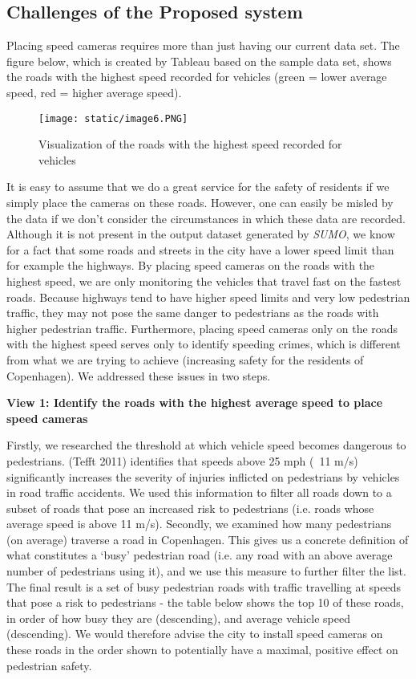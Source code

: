 \documentclass[format=acmsmall, review=false, screen=true]{acmart}
\begin{document}
\subsection{Challenges of the Proposed system}

Placing speed cameras requires more than just having our current data set. The figure below, which is created by Tableau based on the sample data set, shows the roads with the highest speed recorded for vehicles (green = lower average speed, red = higher average speed).

\begin{figure}[H]
  \texttt{[image: static/image6.PNG]}
  \caption{Visualization of the roads with the highest speed recorded for vehicles}
  \label{fig:verticalpartitioning-diagram}
\end{figure}


It is easy to assume that we do a great service for the safety of residents if we simply place the cameras on these roads. However, one can easily be misled by the data if we don’t consider the circumstances in which these data are recorded. Although it is not present in the output dataset generated by \textit{SUMO}, we know for a fact that some roads and streets in the city have a lower speed limit than for example the highways. By placing speed cameras on the roads with the highest speed, we are only monitoring the vehicles that travel fast on the fastest roads. Because highways tend to have higher speed limits and very low pedestrian traffic, they may not pose the same danger to pedestrians as the roads with higher pedestrian traffic. Furthermore, placing speed cameras only on the roads with the highest speed serves only to identify speeding crimes, which is different from what we are trying to achieve (increasing safety for the residents of Copenhagen). We addressed these issues in two steps.

\textbf{View 1: Identify the roads with the highest average speed to place speed cameras}

Firstly, we researched the threshold at which vehicle speed becomes dangerous to pedestrians. (Tefft 2011) identifies that speeds above 25 mph (~11 m/s) significantly increases the severity of injuries inflicted on pedestrians by vehicles in road traffic accidents. We used this information to filter all roads down to a subset of roads that pose an increased risk to pedestrians (i.e. roads whose average speed is above 11 m/s). Secondly, we examined how many pedestrians (on average) traverse a road in Copenhagen. This gives us a concrete definition of what constitutes a ‘busy’ pedestrian road (i.e. any road with an above average number of pedestrians using it), and we use this measure to further filter the list. The final result is a set of busy pedestrian roads with traffic travelling at speeds that pose a risk to pedestrians - the table below shows the top 10 of these roads, in order of how busy they are (descending), and average vehicle speed (descending). We would therefore advise the city to install speed cameras on these roads in the order shown to potentially have a maximal, positive effect on pedestrian safety.
\end{document}
